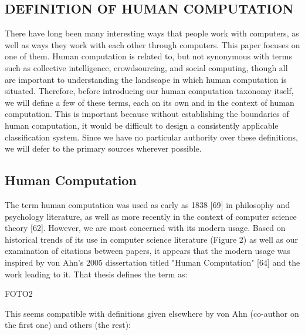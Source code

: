 \documentclass{sig-alternate}
\begin{document}
\subsection*{DEFINITION OF HUMAN COMPUTATION}
There have long been many interesting ways that people work with computers, as well as ways they work with each other through computers. This paper focuses on one of them. Human computation is related to, but not synonymous with terms such as collective intelligence, crowdsourcing, and social computing, though all are important to understanding the landscape in which human computation is situated. Therefore, before introducing our human computation taxonomy itself, we will define a few of these terms, each on its own and in the context of human computation. This is important because without establishing the boundaries of human computation, it would be difficult to design a consistently applicable classification system. Since we have no particular authority over these definitions, we will defer to the primary sources wherever possible.
\subsection*{Human Computation}
The term human computation was used as early as 1838 [69] in philosophy and psychology literature, as well as more recently in the context of computer science theory [62]. However, we are most concerned with its modern usage. Based on historical trends of its use in computer science literature (Figure 2) as well as our examination of citations between papers, it appears that the modern usage was inspired by von Ahn’s 2005 dissertation titled "Human Computation" [64] and the work leading to it. That thesis defines the term as:



FOTO2

This seems compatible with definitions given elsewhere by von Ahn (co-author on the first one) and others (the rest):


\end{document}
